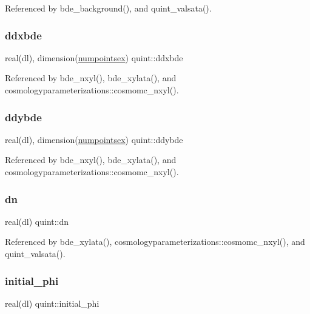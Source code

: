 Referenced by bde\+\_\+background(), and quint\+\_\+valsata().

\mbox{\label{namespacequint_adc4851c280622a1d594cbcc28e15aba1}} 
\subsubsection{\texorpdfstring{ddxbde}{ddxbde}}
{\footnotesize\ttfamily real(dl), dimension(\mbox{\hyperlink{namespacequint_a8388814d2fb6e0f54431a7257a8f86a9}{numpointsex}}) quint\+::ddxbde}



Referenced by bde\+\_\+nxyl(), bde\+\_\+xylata(), and cosmologyparameterizations\+::cosmomc\+\_\+nxyl().

\mbox{\label{namespacequint_a10a79a1d7070650f6f67d1de7fa4b34a}} 
\subsubsection{\texorpdfstring{ddybde}{ddybde}}
{\footnotesize\ttfamily real(dl), dimension(\mbox{\hyperlink{namespacequint_a8388814d2fb6e0f54431a7257a8f86a9}{numpointsex}}) quint\+::ddybde}



Referenced by bde\+\_\+nxyl(), bde\+\_\+xylata(), and cosmologyparameterizations\+::cosmomc\+\_\+nxyl().

\mbox{\label{namespacequint_af323f47cbdf135c3f3f626b07465f347}} 
\subsubsection{\texorpdfstring{dn}{dn}}
{\footnotesize\ttfamily real(dl) quint\+::dn}



Referenced by bde\+\_\+xylata(), cosmologyparameterizations\+::cosmomc\+\_\+nxyl(), and quint\+\_\+valsata().

\mbox{\label{namespacequint_a7992ff4df2efe5528a1a109c6d0533db}} 
\subsubsection{\texorpdfstring{initial\+\_\+phi}{initial\_phi}}
{\footnotesize\ttfamily real(dl) quint\+::initial\+\_\+phi}

